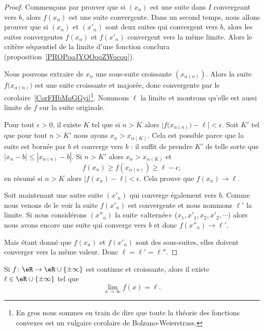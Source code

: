 \begin{proof}
	Commençons par prouver que si \( (x_n)\) est une suite dans \( I\) convergeant vers \( b\), alors \( f(x_n)\) est une suite convergente. Dans un second temps, nous allons prouver que si \( (x_n)\) et \( (x'_n)\) sont deux suites qui convergent vers \( b\), alors les suites convergentes \( f(x_n)\) et \( f(x'_n)\) convergent vers la même limite. Alors le critère séquentiel de la limite d'une fonction conclura (proposition~\ref{PROPooJYOOooZWocoq}).

	Nous pouvons extraire de \( x_n\) une sous-suite croissante \( (x_{\alpha(n)})\). Alors la suite \( f\big( x_{\alpha(n)} \big)\) est une suite croissante et majorée, donc convergente par le corolaire~\ref{CorFHbMqGGyi}\footnote{En gros nous sommes en train de dire que toute la théorie des fonctions convexes est un vulgaire corolaire de Bolzano-Weierstrass.}. Nommons \( \ell\) la limite et montrons qu'elle est aussi limite de \( f\) sur la suite originale.

	Pour tout \( \epsilon>0\), il existe \( K\) tel que si \( n>K\) alors \( \big| f\big( x_{\alpha(n)} \big)-\ell \big|<\epsilon\). Soit \( K'\) tel que pour tout \( n>K'\) nous ayons \( x_n>x_{\alpha(K)}\). Cela est possible parce que la suite est bornée par \( b\) et converge vers \( b\) : il suffit de prendre \( K'\) de telle sorte que \( | x_n-b |\leq | x_{\alpha(n)}-b |\). Si \( n>K'\) alors \( x_n>x_{\alpha(K)}\) et
	\begin{equation}
		f(x_n)\geq f(x_{\alpha(n)})\geq \ell-\epsilon;
	\end{equation}
	en résumé si \( n>K\) alors \( | f(x_n)-\ell |<\epsilon\). Cela prouve que \( f(x_n)\to\ell\).

	Soit maintenant une autre suite \( (x'_n)\) qui converge également vers \( b\). Comme nous venons de le voir la suite \( f(x'_n)\) est convergente et nous nommons \( \ell'\) la limite. Si nous considérons \( (x''_n)\) la suite «alternée» (\( x_1,x'_1,x_2,x'_2,\cdots\)) alors nous avons encore une suite qui converge vers \( b\) et donc \( f(x''_n)\to \ell'\).

	Mais étant donné que \( f(x_n)\) et \( f(x'_n)\) sont des sous-suites, elles doivent converger vers la même valeur. Donc \( \ell=\ell'=\ell''\).
\end{proof}


\begin{proposition}     \label{PROPooGQHKooWgykjW}
	Si \( f\colon \eR\to \eR\cup\{ \pm\infty \}\) est continue et croissante, alors il existe \( \ell\in \eR\cup\{ \pm\infty \}\) tel que
	\begin{equation}
		\lim_{x\to \infty} f(x)=\ell.
	\end{equation}
\end{proposition}

